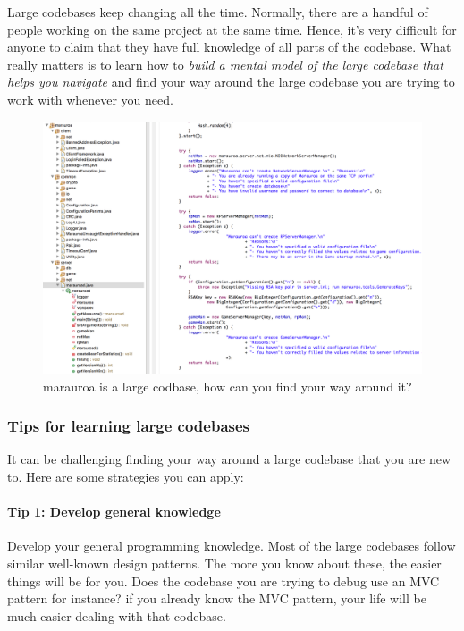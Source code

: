 \documentclass[
]{book}
\begin{document}
Large codebases keep changing all the time. Normally, there are a handful of people working on the same project at the same time. Hence, it's very difficult for anyone to claim that they have full knowledge of all parts of the codebase. What really matters is to learn how to \emph{build a mental model of the large codebase that helps you navigate} and find your way around the large codebase you are trying to work with whenever you need.

\begin{figure}

{\centering \includegraphics[width=1\linewidth]{images/marauroa} 

}

\caption{marauroa is a large codbase, how can you find your way around it?}\label{fig:marauroa-fig}
\end{figure}

\hypertarget{tips}{%
\subsubsection{Tips for learning large codebases}\label{tips}}

It can be challenging finding your way around a large codebase that you are new to. Here are some strategies you can apply:

\hypertarget{tip-1-develop-general-knowledge}{%
\paragraph{Tip 1: Develop general knowledge}\label{tip-1-develop-general-knowledge}}

Develop your general programming knowledge. Most of the large codebases follow similar well-known design patterns. The more you know about these, the easier things will be for you. Does the codebase you are trying to debug use an MVC pattern for instance? if you already know the MVC pattern, your life will be much easier dealing with that codebase.
\end{document}
